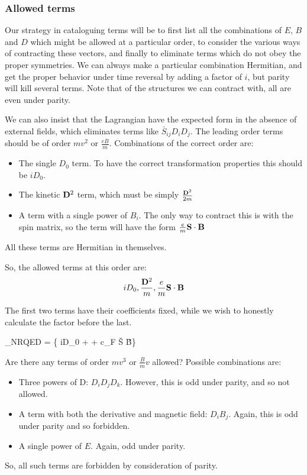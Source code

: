 


\subsubsection{Allowed terms}
Our strategy in cataloguing terms will be to first list all the combinations of $E$, $B$ and $D$ which might be allowed at a particular order, to consider the various ways of contracting these vectors, and finally to eliminate terms which do not obey the proper symmetries.  We can always make a particular combination Hermitian, and get the proper behavior under time reversal by adding a factor of $i$, but parity will kill several terms.  Note that of the structures we can contract with, all are even under parity.


We can also insist that the Lagrangian have the expected form in the absence of external fields, which eliminates terms like $\bar{S}_{ij}D_i D_j$.  The leading order terms should be of order $mv^2$ or $\frac{eB}{m}$.  Combinations of the correct order are:
\begin{itemize}
  \item The single $D_0$ term.  To have the correct transformation properties this should be $iD_0$.
  \item The kinetic $\mathbf{D}^2$ term, which must be simply $\frac{\mathbf{D}^2}{2m}$
  \item A term with a single power of $B_i$.  The only way to contract this is with the spin matrix, so the term will have the form $\frac{e}{m} \mathbf{S} \cdot \mathbf{B}$
\end{itemize}
All these terms are Hermitian in themselves.

So, the allowed terms at this order are:
\[
	iD_0, \frac{\mathbf{D}^2}{m}, \frac{e}{m} \mathbf{S} \cdot \mathbf{B}
\]

The first two terms have their coefficients fixed, while we wish to honestly calculate the factor before the last.

\beq \label{eq:nrLFirstOrder}
	_{NRQED} = \fnrb \Bigg\{ iD_0 +    +  c_F  \v{S} \cdot \v{B}\Bigg \} \fnr
\eeq

Are there any terms of order $mv^3$ or $\frac{B}{m}v$ allowed?  Possible combinations are:
\begin{itemize}
  \item Three powers of D: $D_i D_j D_k$.  However, this is odd under parity, and so not allowed.  
  \item A term with both the derivative and magnetic field: $D_i B_j$.  Again, this is odd under parity and so forbidden.
  \item A single power of $E$.  Again, odd under parity.
\end{itemize}
So, all such terms are forbidden by consideration of parity.

